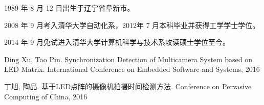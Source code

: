 \begin{resume}


  1989 年 8 月 12 日出生于辽宁省阜新市。

  2008 年 9 月考入清华大学自动化系，2012年 7 月本科毕业并获得工学学士学位。

  2014 年 9 月免试进入清华大学计算机科学与技术系攻读硕士学位至今。

  \begin{publications}
  \item Ding Xu, Tao Pin. Synchronization Detection of Multicamera System based on LED Matrix. International Conference on Embedded Software and Systems, 2016
  \item 丁旭, 陶品. 基于LED点阵的摄像机拍摄时间检测方法. Conference on Pervasive Computing of China, 2016
  \end{publications}

\end{resume}
